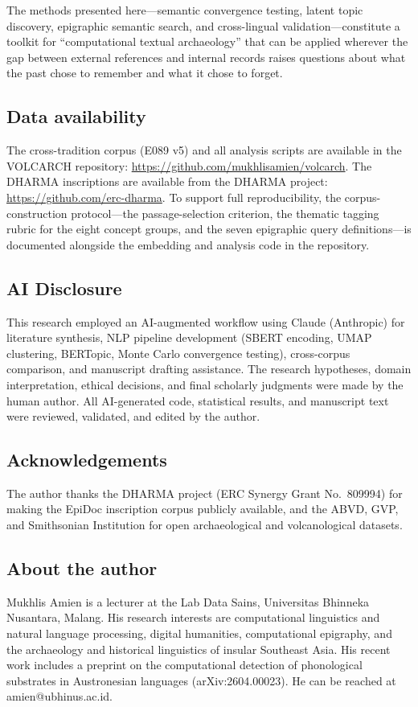\documentclass[12pt]{article}
\begin{document}
The methods presented here---semantic convergence testing, latent topic discovery, epigraphic semantic search, and cross-lingual validation---constitute a toolkit for ``computational textual archaeology'' that can be applied wherever the gap between external references and internal records raises questions about what the past chose to remember and what it chose to forget.


\subsection*{Data availability}

The cross-tradition corpus (E089 v5) and all analysis scripts are available in the VOLCARCH repository: \url{https://github.com/mukhlisamien/volcarch}.
The DHARMA inscriptions are available from the DHARMA project: \url{https://github.com/erc-dharma}.
To support full reproducibility, the corpus-construction protocol---the passage-selection criterion, the thematic tagging rubric for the eight concept groups, and the seven epigraphic query definitions---is documented alongside the embedding and analysis code in the repository.

\subsection*{AI Disclosure}

This research employed an AI-augmented workflow using Claude (Anthropic) for
literature synthesis, NLP pipeline development (SBERT encoding, UMAP clustering,
BERTopic, Monte Carlo convergence testing), cross-corpus comparison, and
manuscript drafting assistance.
The research hypotheses, domain interpretation, ethical decisions, and final
scholarly judgments were made by the human author.
All AI-generated code, statistical results, and manuscript text were reviewed,
validated, and edited by the author.


\subsection*{Acknowledgements}

The author thanks the DHARMA project (ERC Synergy Grant No.\ 809994) for making the EpiDoc inscription corpus publicly available, and the ABVD, GVP, and Smithsonian Institution for open archaeological and volcanological datasets.

\subsection*{About the author}
Mukhlis Amien is a lecturer at the Lab Data Sains, Universitas Bhinneka Nusantara, Malang. His research interests are computational linguistics and natural language processing, digital humanities, computational epigraphy, and the archaeology and historical linguistics of insular Southeast Asia. His recent work includes a preprint on the computational detection of phonological substrates in Austronesian languages (arXiv:2604.00023). He can be reached at amien@ubhinus.ac.id.


\end{document}
